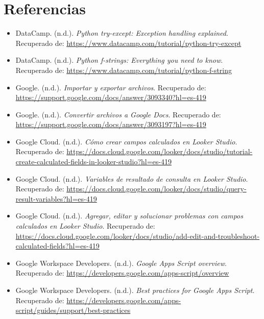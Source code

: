 \documentclass[12pt]{article}
\begin{document}
\section*{Referencias}

\begin{itemize}
    \item DataCamp. (n.d.). \textit{Python try-except: Exception handling explained}.  
    Recuperado de: \url{https://www.datacamp.com/tutorial/python-try-except}

    \item DataCamp. (n.d.). \textit{Python f-strings: Everything you need to know}.  
    Recuperado de: \url{https://www.datacamp.com/tutorial/python-f-string}

    \item Google. (n.d.). \textit{Importar y exportar archivos}.  
    Recuperado de: \url{https://support.google.com/docs/answer/3093340?hl=es-419}

    \item Google. (n.d.). \textit{Convertir archivos a Google Docs}.  
    Recuperado de: \url{https://support.google.com/docs/answer/3093197?hl=es-419}

    \item Google Cloud. (n.d.). \textit{Cómo crear campos calculados en Looker Studio}.  
    Recuperado de: \url{https://docs.cloud.google.com/looker/docs/studio/tutorial-create-calculated-fields-in-looker-studio?hl=es-419}

    \item Google Cloud. (n.d.). \textit{Variables de resultado de consulta en Looker Studio}.  
    Recuperado de: \url{https://docs.cloud.google.com/looker/docs/studio/query-result-variables?hl=es-419}

    \item Google Cloud. (n.d.). \textit{Agregar, editar y solucionar problemas con campos calculados en Looker Studio}.  
    Recuperado de: \url{https://docs.cloud.google.com/looker/docs/studio/add-edit-and-troubleshoot-calculated-fields?hl=es-419}

        \item Google Workspace Developers. (n.d.). \textit{Google Apps Script overview}.  
    Recuperado de: \url{https://developers.google.com/apps-script/overview}

    \item Google Workspace Developers. (n.d.). \textit{Best practices for Google Apps Script}.  
    Recuperado de: \url{https://developers.google.com/apps-script/guides/support/best-practices}


\end{itemize}
\end{document}
